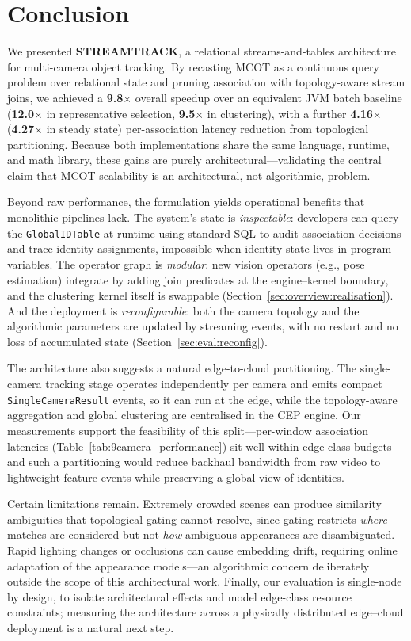 \documentclass[5p,times]{elsarticle}
\begin{document}
\section{Conclusion}\label{sec:conclusion}
We presented \textbf{STREAMTRACK}, a relational streams-and-tables architecture for multi-camera object tracking. By recasting MCOT as a continuous query problem over relational state and pruning association with topology-aware stream joins, we achieved a \textbf{9.8$\times$} overall speedup over an equivalent JVM batch baseline (\textbf{12.0$\times$} in representative selection, \textbf{9.5$\times$} in clustering), with a further \textbf{4.16$\times$} (\textbf{4.27$\times$} in steady state) per-association latency reduction from topological partitioning. Because both implementations share the same language, runtime, and math library, these gains are purely architectural---validating the central claim that MCOT scalability is an architectural, not algorithmic, problem.

Beyond raw performance, the formulation yields operational benefits that monolithic pipelines lack. The system's state is \emph{inspectable}: developers can query the \texttt{GlobalIDTable} at runtime using standard SQL to audit association decisions and trace identity assignments, impossible when identity state lives in program variables. The operator graph is \emph{modular}: new vision operators (e.g., pose estimation) integrate by adding join predicates at the engine--kernel boundary, and the clustering kernel itself is swappable (Section~\ref{sec:overview:realisation}). And the deployment is \emph{reconfigurable}: both the camera topology and the algorithmic parameters are updated by streaming events, with no restart and no loss of accumulated state (Section~\ref{sec:eval:reconfig}).

The architecture also suggests a natural edge-to-cloud partitioning. The single-camera tracking stage operates independently per camera and emits compact \texttt{SingleCameraResult} events, so it can run at the edge, while the topology-aware aggregation and global clustering are centralised in the CEP engine. Our measurements support the feasibility of this split---per-window association latencies (Table~\ref{tab:9camera_performance}) sit well within edge-class budgets---and such a partitioning would reduce backhaul bandwidth from raw video to lightweight feature events while preserving a global view of identities.

Certain limitations remain. Extremely crowded scenes can produce similarity ambiguities that topological gating cannot resolve, since gating restricts \emph{where} matches are considered but not \emph{how} ambiguous appearances are disambiguated. Rapid lighting changes or occlusions can cause embedding drift, requiring online adaptation of the appearance models---an algorithmic concern deliberately outside the scope of this architectural work. Finally, our evaluation is single-node by design, to isolate architectural effects and model edge-class resource constraints; measuring the architecture across a physically distributed edge--cloud deployment is a natural next step.
\end{document}
